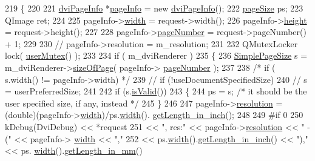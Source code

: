 \begin{DoxyCode}
219 \{
220 
221     \hyperlink{classdviPageInfo}{dviPageInfo} *\hyperlink{classpageInfo}{pageInfo} = \textcolor{keyword}{new} \hyperlink{classdviPageInfo}{dviPageInfo}();
222     \hyperlink{classpageSize}{pageSize} ps;
223     QImage ret;
224 
225     pageInfo->\hyperlink{classdviPageInfo_ae69134192cb1f4a18c3eb8e52e52be73}{width} = request->width();
226     pageInfo->\hyperlink{classdviPageInfo_af6aae8bcca7fab26e073f0cda75197ad}{height} = request->height();
227 
228     pageInfo->\hyperlink{classdviPageInfo_a53def64ce72621ae5c95524cec77ee2e}{pageNumber} = request->pageNumber() + 1;
229 
230 \textcolor{comment}{//  pageInfo->resolution = m\_resolution;}
231 
232     QMutexLocker lock( \hyperlink{classOkular_1_1Generator_a83d702cccbce2288c3258d97f1f15e19}{userMutex}() );
233 
234     \textcolor{keywordflow}{if} ( m\_dviRenderer )
235     \{
236         \hyperlink{classSimplePageSize}{SimplePageSize} s = m\_dviRenderer->\hyperlink{classdviRenderer_a8d5430b14cdc4bdf6579402004f31317}{sizeOfPage}( pageInfo->
      \hyperlink{classdviPageInfo_a53def64ce72621ae5c95524cec77ee2e}{pageNumber} );
237 
238 \textcolor{comment}{/*       if ( s.width() != pageInfo->width) */}
239         \textcolor{comment}{//   if (!useDocumentSpecifiedSize)}
240         \textcolor{comment}{//    s = userPreferredSize;}
241 
242         \textcolor{keywordflow}{if} (s.\hyperlink{classSimplePageSize_acc614937770417e54201cac058ed19be}{isValid}())
243         \{
244             ps = s; \textcolor{comment}{/* it should be the user specified size, if any, instead */}
245         \}
246 
247         pageInfo->\hyperlink{classdviPageInfo_a1a941bfcf6edfb69562bccf5f392a268}{resolution} = (double)(pageInfo->\hyperlink{classdviPageInfo_ae69134192cb1f4a18c3eb8e52e52be73}{width})/ps.\hyperlink{classSimplePageSize_a5866f4c04635b09ec065a1fc45f9d1df}{width}().
      \hyperlink{classLength_afbaef4ba8d8a3e97873ed5cfd20c7dea}{getLength\_in\_inch}();
248 
249 \textcolor{preprocessor}{#if 0}
250         kDebug(DviDebug) << *request
251         << \textcolor{stringliteral}{", res:"} << pageInfo->\hyperlink{classdviPageInfo_a1a941bfcf6edfb69562bccf5f392a268}{resolution} << \textcolor{stringliteral}{" - ("} << pageInfo->
      \hyperlink{classdviPageInfo_ae69134192cb1f4a18c3eb8e52e52be73}{width} << \textcolor{stringliteral}{","}
252         << ps.\hyperlink{classSimplePageSize_a5866f4c04635b09ec065a1fc45f9d1df}{width}().\hyperlink{classLength_afbaef4ba8d8a3e97873ed5cfd20c7dea}{getLength\_in\_inch}() << \textcolor{stringliteral}{"),"} << ps.
      \hyperlink{classSimplePageSize_a5866f4c04635b09ec065a1fc45f9d1df}{width}().\hyperlink{classLength_ab57252f3b49a668104d76396b2c74041}{getLength\_in\_mm}()

\end{DoxyCode}
